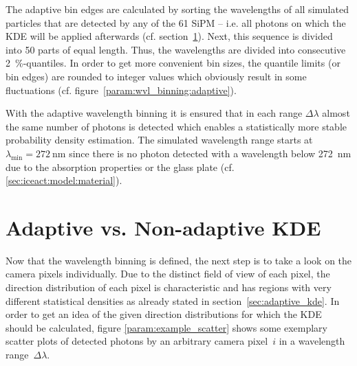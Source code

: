 The adaptive bin edges are calculated by sorting the wavelengths of all simulated particles that are detected by any of the 61 SiPM -- i.e. all photons on which the KDE will be applied afterwards (cf. section~\ref{sec:adaptive_vs_nonadaptive}). Next, this sequence is divided into \num{50} parts of equal length. Thus, the wavelengths are divided into consecutive \SI{2}{\percent}-quantiles. In order to get more convenient bin sizes, the quantile limits (or bin edges) are rounded to integer values which obviously result in some fluctuations (cf. figure~\ref{param:wvl_binning:adaptive}).

With the adaptive wavelength binning it is ensured that in each range $\Delta\lambda$ almost the same number of photons is detected which enables a statistically more stable probability density estimation. The simulated wavelength range starts at $\lambda_\text{min}=\SI{272}{\nano\meter}$ since there is no photon detected with a wavelength below \SI{272}{\nano\meter} due to the absorption properties or the glass plate (cf. \ref{sec:iceact:model:material}).

\section{Adaptive vs. Non-adaptive KDE}\label{sec:adaptive_vs_nonadaptive}

Now that the wavelength binning is defined, the next step is to take a look on the camera pixels individually. Due to the distinct field of view of each pixel, the direction distribution of each pixel is characteristic and has regions with very different statistical densities as already stated in section~\ref{sec:adaptive_kde}. In order to get an idea of the given direction distributions for which the KDE should be calculated, figure \ref{param:example_scatter} shows some exemplary scatter plots of detected photons by an arbitrary camera pixel~$i$ in a wavelength range~$\Delta\lambda$.\\

